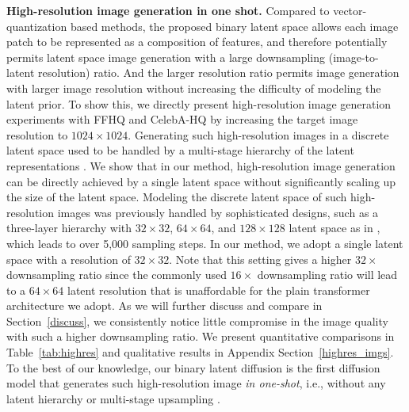 \documentclass[10pt,twocolumn,letterpaper]{article}
\begin{document}
\noindent \textbf{High-resolution image generation in one shot.} 
Compared to vector-quantization based methods, the proposed binary latent space allows each image patch to be represented as a composition of features, and therefore potentially permits latent space image generation with a large downsampling (image-to-latent resolution) ratio. 
And the larger resolution ratio permits image generation with larger image resolution without increasing the difficulty of modeling the latent prior. 
To show this, we directly present high-resolution image generation experiments with FFHQ and CelebA-HQ by increasing the target image resolution to $1024\times1024$. Generating such high-resolution images in a discrete latent space used to be handled by a multi-stage hierarchy of the latent representations \cite{vqvae2,yan2021videogpt,yu2021vector}. We show that in our method, high-resolution image generation can be directly achieved by a single latent space without significantly scaling up the size of the latent space. 
Modeling the discrete latent space of such high-resolution images was previously handled by sophisticated designs, such as a three-layer hierarchy with $32 \times 32$, $64 \times 64$, and $128 \times 128$ latent space as in \cite{vqvae2}, which leads to over 5,000 sampling steps. 
In our method, we adopt a single latent space with a resolution of $32\times32$. Note that this setting gives a higher $32\times$ downsampling ratio since the commonly used $16\times$ downsampling ratio will lead to a $64\times64$ latent resolution that is unaffordable for the plain transformer architecture we adopt. 
As we will further discuss and compare in Section~\ref{discuss}, we consistently notice little compromise in the image quality with such a higher downsampling ratio. 
We present quantitative comparisons in Table~\ref{tab:highres} and qualitative results in Appendix Section~\ref{highres_imgs}.
To the best of our knowledge, our binary latent diffusion is the first diffusion model that generates such high-resolution image \textit{in one-shot}, i.e., without any latent hierarchy \cite{vqvae2} or multi-stage upsampling \cite{dalle2}.



\end{document}
